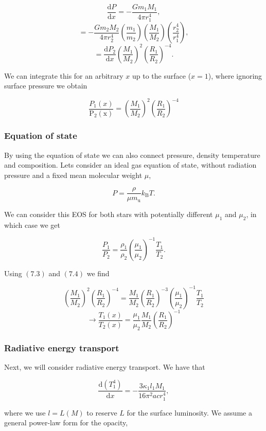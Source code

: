 \documentclass[twocolumn]{article}
\begin{document}
\[\frac{\mathrm{d}P}{\mathrm{d}x}=-\frac{Gm_1M_1}{4\pi r_1^4},\]
\[=-\frac{Gm_2M_2}{4\pi r_2^4}\left(\frac{m_1}{m_2}\right)\left(\frac{M_1}{M_2}\right)\left(\frac{r_2^4}{r_1^4}\right),\]
\[=\frac{\mathrm{d}P_2}{\mathrm{d}x}\left(\frac{M_1}{M_2}\right)^2\left(\frac{R_1}{R_2}\right)^{-4}.\]

We can integrate this for an arbitrary \(x\) up to the surface
(\(x=1\)), where ignoring surface pressure we obtain

\[\boxed{\frac{P_1(x)}{\mathrm{P_2(x)}}=\left(\frac{M_1}{M_2}\right)^2\left(\frac{R_1}{R_2}\right)^{-4}}\tag{7.4}\]

\hypertarget{equation-of-state}{%
\subsubsection{Equation of state}\label{equation-of-state}}

By using the equation of state we can also connect pressure, density
temperature and composition. Lets consider an ideal gas equation of
state, without radiation pressure and a fixed mean molecular weight
\(\mu\),

\[P=\frac{\rho}{\mu m_\mathrm{u}}k_\mathrm{B}T.\]

We can consider this EOS for both stars with potentially different
\(\mu_1\) and \(\mu_2\), in which case we get

\[\frac{P_1}{P_2}=\frac{\rho_1}{\rho_2}\left(\frac{\mu_1}{\mu_2}\right)^{-1}\frac{T_1}{T_2}.\]

Using \((7.3)\) and \((7.4)\) we find

\[\left(\frac{M_1}{M_2}\right)^2\left(\frac{R_1}{R_2}\right)^{-4}=\frac{M_1}{M_2}\left(\frac{R_1}{R_2}\right)^{-3}\left(\frac{\mu_1}{\mu_2}\right)^{-1}\frac{T_1}{T_2}\]
\[\rightarrow \boxed{\frac{T_1(x)}{T_2(x)}=\frac{\mu_1}{\mu_2}\frac{M_1}{M_2}\left(\frac{R_1}{R_2}\right)^{-1}}\tag{7.5}\]

\hypertarget{radiative-energy-transport-1}{%
\subsubsection{Radiative energy
transport}\label{radiative-energy-transport-1}}

Next, we will consider radiative energy transport. We have that

\[\frac{\mathrm{d}(T_1^4)}{\mathrm{d}x}=-\frac{3\kappa_1 l_1 M_1}{16\pi^2 a c r_1^4},\tag{7.6}\]

where we use \(l=L(M)\) to reserve \(L\) for the surface luminosity. We
assume a general power-law form for the opacity,
\end{document}
